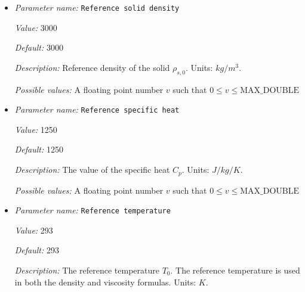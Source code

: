 \begin{itemize}
{\it Value:} 5e20


{\it Default:} 5e20


{\it Description:} The value of the constant viscosity $\eta_0$ of the solid matrix. This viscosity may be modified by both temperature and porosity dependencies. Units: $Pa \, s$.


{\it Possible values:} A floating point number $v$ such that $0 \leq v \leq \text{MAX\_DOUBLE}$
\item {\it Parameter name:} {\tt Reference solid density}
\label{parameters:Material model/Melt simple/Reference solid density}
\label{parameters:Material_20model/Melt_20simple/Reference_20solid_20density}


{\it Value:} 3000


{\it Default:} 3000


{\it Description:} Reference density of the solid $\rho_{s,0}$. Units: $kg/m^3$.


{\it Possible values:} A floating point number $v$ such that $0 \leq v \leq \text{MAX\_DOUBLE}$
\item {\it Parameter name:} {\tt Reference specific heat}
\label{parameters:Material model/Melt simple/Reference specific heat}
\label{parameters:Material_20model/Melt_20simple/Reference_20specific_20heat}


{\it Value:} 1250


{\it Default:} 1250


{\it Description:} The value of the specific heat $C_p$. Units: $J/kg/K$.


{\it Possible values:} A floating point number $v$ such that $0 \leq v \leq \text{MAX\_DOUBLE}$
\item {\it Parameter name:} {\tt Reference temperature}
\label{parameters:Material model/Melt simple/Reference temperature}
\label{parameters:Material_20model/Melt_20simple/Reference_20temperature}


{\it Value:} 293


{\it Default:} 293


{\it Description:} The reference temperature $T_0$. The reference temperature is used in both the density and viscosity formulas. Units: $K$.



\end{itemize}
